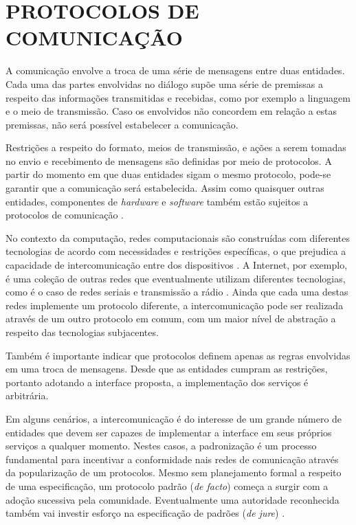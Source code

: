 \chapter{PROTOCOLOS DE COMUNICAÇÃO}

A comunicação envolve a troca de uma série de mensagens entre duas entidades. Cada
uma das partes envolvidas no diálogo supõe uma série de premissas a respeito das
informações transmitidas e recebidas, como por exemplo a linguagem e o meio de
transmissão. Caso os envolvidos não concordem em relação a estas premissas, não
será possível estabelecer a comunicação.

Restrições a respeito do formato, meios de transmissão, e ações a serem tomadas no
envio e recebimento de mensagens são definidas por meio de protocolos. A partir do
momento em que duas entidades sigam o mesmo protocolo, pode-se garantir que a
comunicação será estabelecida. Assim como quaisquer outras entidades, componentes de
\textit{hardware} e \textit{software} também estão sujeitos a protocolos de
comunicação \cite{kurose2012}.

No contexto da computação, redes computacionais são construídas com diferentes
tecnologias de acordo com necessidades e restrições específicas, o que prejudica a
capacidade de intercomunicação entre dos dispositivos \cite{comer2000}. A Internet,
por exemplo, é uma coleção de outras redes que eventualmente utilizam diferentes
tecnologias, como é o caso de redes seriais e transmissão a rádio
\cite{tanenbaum2010}. Ainda que cada uma destas redes implemente um protocolo
diferente, a intercomunicação pode ser realizada através de um outro protocolo em
comum, com um maior nível de abstração a respeito das tecnologias subjacentes.

Também é importante indicar que protocolos definem apenas as regras envolvidas em
uma troca de mensagens. Desde que as entidades cumpram as restrições, portanto
adotando a interface proposta, a implementação dos serviços é arbitrária.

Em alguns cenários, a intercomunicação é do interesse de um grande número de
entidades que devem ser capazes de implementar a interface em seus próprios serviços
a qualquer momento. Nestes casos, a padronização é um processo fundamental para
incentivar a conformidade nais redes de comunicação através da popularização de um
protocolos. Mesmo sem planejamento formal a respeito de uma especificação, um
protocolo padrão (\textit{de facto}) começa a surgir com a adoção sucessiva pela
comunidade. Eventualmente uma autoridade reconhecida também vai investir esforço na
especificação de padrões (\textit{de jure}) \cite{tanenbaum2010}.

